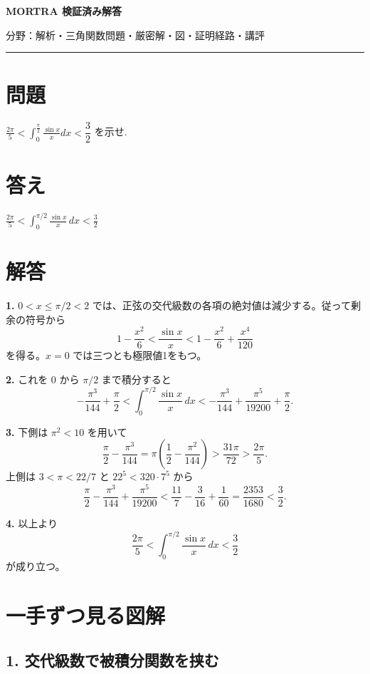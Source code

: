 \documentclass[uplatex,dvipdfmx,11pt]{jsarticle}
\begin{document}
\begin{center}
{\LARGE\bfseries MORTRA 検証済み解答\par}
\vspace{1mm}
{\small 分野：解析・三角関数\qquad 問題・厳密解・図・証明経路・講評}
\end{center}
\vspace{1mm}
\hrule
\vspace{5mm}

\section*{問題}
$\displaystyle \frac{2\pi}{5}<\int_{0}^{\frac{\pi}{2}}\frac{\sin x}{x}dx<\dfrac32$ を示せ.

\section*{答え}
\(\frac{2 \pi}{5}<\displaystyle\int_0^{\pi/2}\frac{\sin x}{x}\,dx<\frac{3}{2}\)

\section*{解答}
\textbf{1.} \(0<x\le\pi/2<2\) では、正弦の交代級数の各項の絶対値は減少する。従って剰余の符号から \[1-\frac{x^2}6<\frac{\sin x}{x}<1-\frac{x^2}6+\frac{x^4}{120}\] を得る。\( x=0\) では三つとも極限値1をもつ。

\textbf{2.} これを \(0\) から \(\pi/2\) まで積分すると \[- \frac{\pi^{3}}{144} + \frac{\pi}{2}<\int_0^{\pi/2}\frac{\sin x}{x}\,dx<- \frac{\pi^{3}}{144} + \frac{\pi^{5}}{19200} + \frac{\pi}{2}.\]

\textbf{3.} 下側は \(\pi^2<10\) を用いて \[\frac{\pi}{2}-\frac{\pi^3}{144}=\pi\left(\frac12-\frac{\pi^2}{144}\right)>\frac{31\pi}{72}>\frac{2\pi}{5}.\] 上側は \(3<\pi<22/7\) と \(22^5<320\cdot7^5\) から \[\frac{\pi}{2}-\frac{\pi^3}{144}+\frac{\pi^5}{19200}<\frac{11}{7}-\frac{3}{16}+\frac{1}{60}=\frac{2353}{1680}<\frac32.\]

\textbf{4.} 以上より \[\frac{2 \pi}{5}<\int_0^{\pi/2}\frac{\sin x}{x}\,dx<\frac{3}{2}\] が成り立つ。

\clearpage

\section*{一手ずつ見る図解}

\subsection*{1. 交代級数で被積分関数を挟む}
\end{document}
